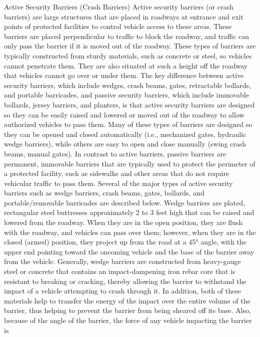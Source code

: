 \documentclass{article}
\begin{document}
Active Security Barriers (Crash Barriers) Active security barriers (or
crash barriers) are large structures that are placed in roadways at
entrance and exit points of protected facilities to control vehicle
access to these areas. These barriers are placed perpendicular to
traffic to block the roadway, and traffic can only pass the barrier if
it is moved out of the roadway. These types of barriers are typically
constructed from sturdy materials, such as concrete or steel, so
vehicles cannot penetrate them. They are also situated at such a height
off the roadway that vehicles cannot go over or under them. The key
difference between active security barriers, which include wedges, crash
beams, gates, retractable bollards, and portable barricades, and passive
security barriers, which include immovable bollards, jersey barriers,
and planters, is that active security barriers are designed so they can
be easily raised and lowered or moved out of the roadway to allow
authorized vehicles to pass them. Many of these types of barriers are
designed so they can be opened and closed automatically (i.e.,
mechanized gates, hydraulic wedge barriers), while others are easy to
open and close manually (swing crash beams, manual gates). In contrast
to active barriers, passive barriers are permanent, immovable barriers
that are typically used to protect the perimeter of a protected
facility, such as sidewalks and other areas that do not require
vehicular traffic to pass them. Several of the major types of active
security barriers such as wedge barriers, crash beams, gates, bollards,
and portable/removable barricades are described below. Wedge barriers
are plated, rectangular steel buttresses approximately 2 to 3 feet high
that can be raised and lowered from the roadway. When they are in the
open position, they are flush with the roadway, and vehicles can pass
over them; however, when they are in the closed (armed) position, they
project up from the road at a 45° angle, with the upper end pointing
toward the oncoming vehicle and the base of the barrier away from the
vehicle. Generally, wedge barriers are constructed from heavy-gauge
steel or concrete that contains an impact-dampening iron rebar core that
is resistant to breaking or cracking, thereby allowing the barrier to
withstand the impact of a vehicle attempting to crash through it. In
addition, both of these materials help to transfer the energy of the
impact over the entire volume of the barrier, thus helping to prevent
the barrier from being sheared off its base. Also, because of the angle
of the barrier, the force of any vehicle impacting the barrier is
\end{document}
